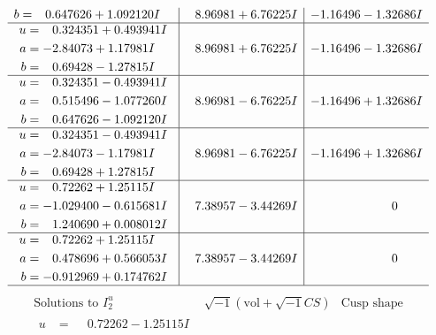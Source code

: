 \documentclass[1p]{elsarticle_modified}
\theoremstyle{definition}
\newcommand{\I}{\sqrt{-1}}
\begin{document}
$$\begin{array}{c|c|c}
\begin{aligned}
b &= \phantom{-}0.647626 + 1.092120 I\end{aligned}
 & \phantom{-}8.96981 + 6.76225 I & -1.16496 - 1.32686 I \\ \hline\begin{aligned}
u &= \phantom{-}0.324351 + 0.493941 I \\
a &= -2.84073 + 1.17981 I \\
b &= \phantom{-}0.69428 - 1.27815 I\end{aligned}
 & \phantom{-}8.96981 + 6.76225 I & -1.16496 - 1.32686 I \\ \hline\begin{aligned}
u &= \phantom{-}0.324351 - 0.493941 I \\
a &= \phantom{-}0.515496 - 1.077260 I \\
b &= \phantom{-}0.647626 - 1.092120 I\end{aligned}
 & \phantom{-}8.96981 - 6.76225 I & -1.16496 + 1.32686 I \\ \hline\begin{aligned}
u &= \phantom{-}0.324351 - 0.493941 I \\
a &= -2.84073 - 1.17981 I \\
b &= \phantom{-}0.69428 + 1.27815 I\end{aligned}
 & \phantom{-}8.96981 - 6.76225 I & -1.16496 + 1.32686 I \\ \hline\begin{aligned}
u &= \phantom{-}0.72262 + 1.25115 I \\
a &= -1.029400 - 0.615681 I \\
b &= \phantom{-}1.240690 + 0.008012 I\end{aligned}
 & \phantom{-}7.38957 - 3.44269 I & \phantom{-0.000000 } 0 \\ \hline\begin{aligned}
u &= \phantom{-}0.72262 + 1.25115 I \\
a &= \phantom{-}0.478696 + 0.566053 I \\
b &= -0.912969 + 0.174762 I\end{aligned}
 & \phantom{-}7.38957 - 3.44269 I & \phantom{-0.000000 } 0\\
 \hline 
 \end{array}$$\newpage$$\begin{array}{c|c|c}  
\text{Solutions to }I^u_{2}& \I (\text{vol} + \sqrt{-1}CS) & \text{Cusp shape}\\
 \hline 
\begin{aligned}
u &= \phantom{-}0.72262 - 1.25115 I \\

\end{aligned}
\end{array}$$
\end{document}
